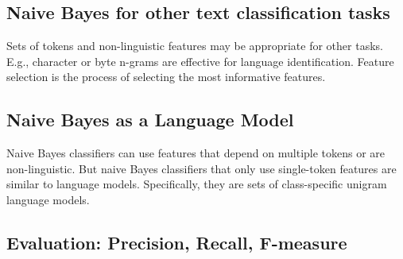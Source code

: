 \subsection{Naive Bayes for other text classification tasks}

Sets of tokens and non-linguistic features may be appropriate for other tasks.
E.g., character or byte n-grams are effective for language identification.
Feature selection is the process of selecting the most informative features.

\subsection{Naive Bayes as a Language Model}

Naive Bayes classifiers can use features that depend on multiple tokens or are
non-linguistic.
But naive Bayes classifiers that only use single-token features are similar to
language models.
Specifically, they are sets of class-specific unigram language models.

\subsection{Evaluation: Precision, Recall, F-measure}

